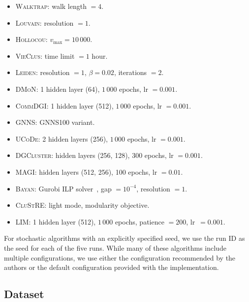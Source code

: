 \documentclass[../paper.tex]{subfiles}
\begin{document}
\begin{itemize}
    \item \textsc{Walktrap}: walk length $=4$.
    \item \textsc{Louvain}: resolution $=1$.
    \item \textsc{Hollocou}: $v_{\max}=10\,000$.
    \item \textsc{VieClus}: time limit $=1$ hour.
    \item \textsc{Leiden}: resolution $=1$, $\beta=0.02$, iterations $=2$.
    \item \textsc{DMoN}: 1 hidden layer (64), $1\,000$ epochs, lr $=0.001$.
    \item \textsc{CommDGI}: 1 hidden layer (512), $1\,000$ epochs, lr $=0.001$.
    \item \textsc{GNNS}: \textsc{GNNS100} variant.
    \item \textsc{UCoDe}: 2 hidden layers (256), $1\,000$ epochs, lr $=0.001$.
    \item \textsc{DGCluster}: hidden layers (256, 128), 300 epochs, lr $=0.001$.
    \item \textsc{MAGI}: hidden layers (512, 256), 100 epochs, lr $=0.01$.
    \item \textsc{Bayan}: Gurobi ILP solver~\cite{gurobi}, gap $=10^{-4}$, resolution $=1$.
    \item \textsc{CluStRE}: light mode, modularity objective.
    \item \textsc{LIM}: 1 hidden layer (512), $1\,000$ epochs, patience $=200$, \hbox{lr $=0.001$.}
\end{itemize}

For stochastic algorithms with an explicitly specified seed, we use the run ID as the seed for each of the five runs. While many of these algorithms include multiple configurations, we use either the configuration recommended by the authors or the default configuration provided with the implementation.

\subsection{Dataset}
\end{document}
